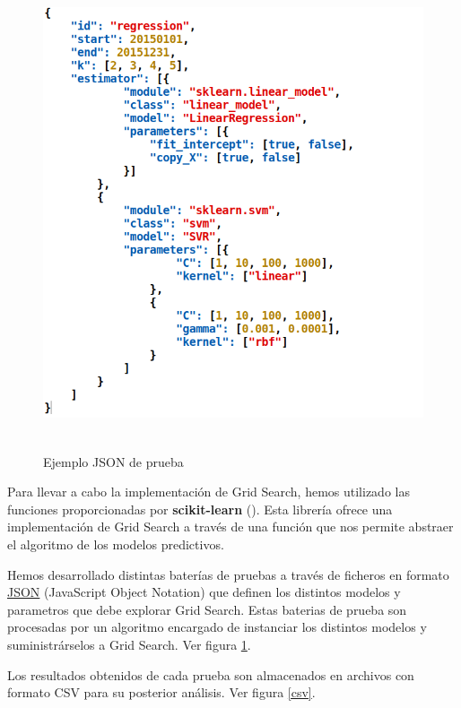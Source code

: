 	\begin{figure}[htb]
		\begin{center}
			\includegraphics[height=5.5in]{figures/json_conf.png}
			\caption{Ejemplo JSON de prueba}
		\end{center}
		\label{json}
	\end{figure}

	Para llevar a cabo la implementación de Grid Search, hemos utilizado las funciones proporcionadas por \textbf{scikit-learn} (\cite{ARP:Scikit:2017}).
	Esta librería ofrece una implementación de Grid Search a través de una función que nos permite abstraer el algoritmo de los modelos predictivos.

	Hemos desarrollado distintas baterías de pruebas a través de ficheros en formato \href{www.json.org/json-es.html}{JSON} (JavaScript Object Notation) que definen los distintos modelos y parametros que debe explorar Grid Search.
	Estas baterias de prueba son procesadas por un algoritmo encargado de instanciar los distintos modelos y suministrárselos a Grid Search. Ver figura \ref{json}.

	Los resultados obtenidos de cada prueba son almacenados en archivos con formato CSV para su posterior análisis. Ver figura \ref{csv}.	

